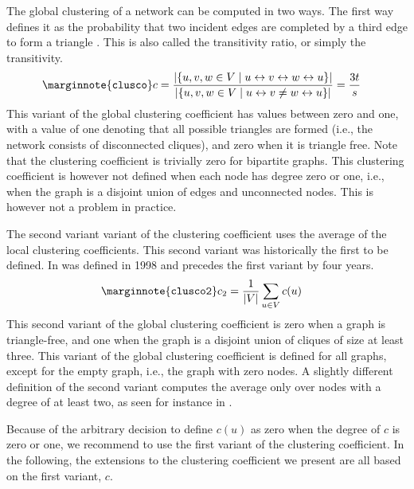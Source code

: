\documentclass{article}
\begin{document}
The global clustering of a network can be computed in two ways.  The
first way defines it as the probability that two incident edges are
completed by a third edge to form a triangle \citep{b736}. This is also
called the transitivity ratio, or simply the transitivity.
\begin{align}
  \marginnote{\texttt{clusco}} c &= 
  \frac {|\{ u, v, w \in V \mid u \leftrightarrow v \leftrightarrow w \leftrightarrow u \}|} 
        {|\{ u, v, w \in V \mid u \leftrightarrow v \neq w \leftrightarrow u \}|} 
        = \frac {3t} s
\end{align}
This variant of the global clustering coefficient has values between
zero and one, with a value of one denoting that all possible triangles
are formed (i.e., the network consists of disconnected cliques), and
zero when it is triangle free.  Note that the clustering coefficient is
trivially zero for bipartite graphs.  This clustering coefficient is
however not defined when each node has degree zero or one, i.e., when
the graph is a disjoint union of edges and unconnected nodes.  This is
however not a problem in practice.

The second variant variant of the clustering coefficient uses the
average of the local clustering coefficients. This second variant was
historically the first to be defined.  In was defined in
1998 \citep{b228} and precedes the first variant by four years.
\begin{align}
  \marginnote{\texttt{clusco2}} c_2 &= \frac 1 {|V|} \sum_{u \in V} c(u)
\end{align}
This second variant of the global clustering coefficient is zero when a
graph is triangle-free, and one when the graph is a disjoint union of
cliques of size at least three.  This variant of the global clustering
coefficient is defined for all graphs, except for the empty graph, i.e.,
the graph with zero nodes.  A slightly different definition of the
second variant computes the average only over nodes with a degree of at
least two, as seen for instance in \citep{b845}.

Because of the arbitrary decision to define $c(u)$ as zero when the
degree of $c$ is zero or one, we recommend to use the first variant of
the clustering coefficient.  In the following, the extensions to the
clustering coefficient we present are all based on the first variant,
$c$.
\end{document}
